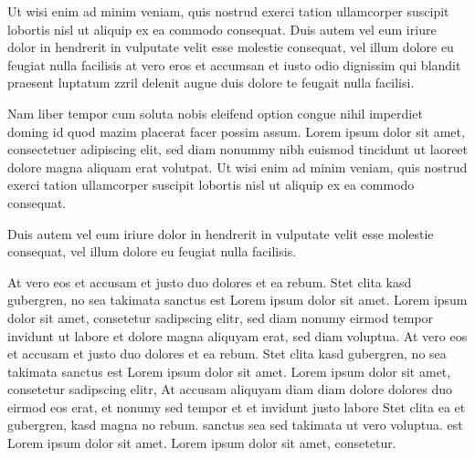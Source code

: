 \documentclass[]{../metanetpaper}
\begin{document}
\begin{Parallel}[c]{80mm}{80mm}
{    Ut wisi enim ad minim veniam, quis nostrud exerci tation ullamcorper suscipit lobortis nisl ut aliquip ex ea commodo consequat. Duis autem vel eum iriure dolor in hendrerit in vulputate velit esse molestie consequat, vel illum dolore eu feugiat nulla facilisis at vero eros et accumsan et iusto odio dignissim qui blandit praesent luptatum zzril delenit augue duis dolore te feugait nulla facilisi.   

    Nam liber tempor cum soluta nobis eleifend option congue nihil imperdiet doming id quod mazim placerat facer possim assum. Lorem ipsum dolor sit amet, consectetuer adipiscing elit, sed diam nonummy nibh euismod tincidunt ut laoreet dolore magna aliquam erat volutpat. Ut wisi enim ad minim veniam, quis nostrud exerci tation ullamcorper suscipit lobortis nisl ut aliquip ex ea commodo consequat.   

    Duis autem vel eum iriure dolor in hendrerit in vulputate velit esse molestie consequat, vel illum dolore eu feugiat nulla facilisis.   

    At vero eos et accusam et justo duo dolores et ea rebum. Stet clita kasd gubergren, no sea takimata sanctus est Lorem ipsum dolor sit amet. Lorem ipsum dolor sit amet, consetetur sadipscing elitr, sed diam nonumy eirmod tempor invidunt ut labore et dolore magna aliquyam erat, sed diam voluptua. At vero eos et accusam et justo duo dolores et ea rebum. Stet clita kasd gubergren, no sea takimata sanctus est Lorem ipsum dolor sit amet. Lorem ipsum dolor sit amet, consetetur sadipscing elitr, At accusam aliquyam diam diam dolore dolores duo eirmod eos erat, et nonumy sed tempor et et invidunt justo labore Stet clita ea et gubergren, kasd magna no rebum. sanctus sea sed takimata ut vero voluptua. est Lorem ipsum dolor sit amet. Lorem ipsum dolor sit amet, consetetur.
  }

\end{Parallel}
\end{document}
